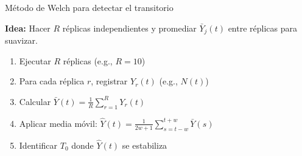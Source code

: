\documentclass[aspectratio=1610, 9pt]{beamer}
\begin{document}
\begin{frame}{Método de Welch para detectar el transitorio}

\textbf{Idea:} Hacer $R$ réplicas independientes y promediar $\bar{Y}_j(t)$ entre réplicas para suavizar.

\vspace{0.2cm}
\begin{enumerate}
    \item Ejecutar $R$ réplicas (e.g., $R = 10$)
    \item Para cada réplica $r$, registrar $Y_r(t)$ (e.g., $N(t)$)
    \item Calcular $\bar{Y}(t) = \frac{1}{R}\sum_{r=1}^R Y_r(t)$
    \item Aplicar media móvil: $\hat{Y}(t) = \frac{1}{2w+1}\sum_{s=t-w}^{t+w} \bar{Y}(s)$
    \item Identificar $T_0$ donde $\hat{Y}(t)$ se estabiliza
\end{enumerate}

\begin{center}
\end{center}
\end{frame}
\end{document}
